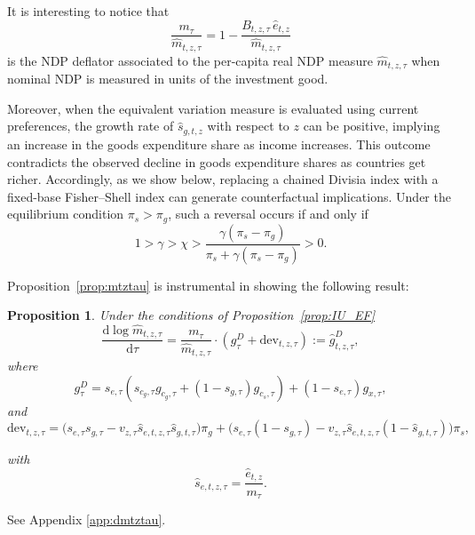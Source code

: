 \documentclass[12pt,a4paper]{article}
\newtheorem{proposition}{Proposition}
\begin{document}
\noindent It is interesting to notice that 
\[
\frac{m_\tau}{\widehat m_{t,z,\tau}} = 1 - \frac{B_{t,z,\tau}\, \widehat e_{t,z}}{\widehat m_{t,z,\tau}}
\]
is the NDP deflator associated to the per-capita real NDP measure $\widehat m_{t,z,\tau}$ when nominal NDP is measured in units of the investment good.

Moreover, when the equivalent variation measure is evaluated using current preferences, the growth rate of \( \widehat{s}_{g,t,z} \) with respect to \( z \) can be positive, implying an increase in the goods expenditure share as income increases. This outcome contradicts the observed decline in goods expenditure shares as countries get richer. Accordingly, as we show below, replacing a chained Divisia index with a fixed-base Fisher--Shell index can generate counterfactual implications. Under the equilibrium condition \( \pi_s > \pi_g \), such a reversal occurs if and only if
\[
1 > \gamma > \chi > \frac{\gamma (\pi_s - \pi_g)}
{\pi_s + \gamma (\pi_s - \pi_g)} > 0.
\]

\noindent Proposition~\ref{prop:mtztau} is instrumental in showing the following result:
\begin{proposition}\label{prop:dmtztau}
Under the conditions of Proposition~\ref{prop:IU_EF}
\[
\frac{\text{d} \log \widehat{m}_{t,z,\tau}}{\text{d}\tau} = 
\frac{m_\tau}{\widehat m_{t,z,\tau}} \cdot 
\left(g^{D}_\tau + \text{dev}_{t,z,\tau} \right) 
:= \widehat g^{D}_{t,z,\tau},
\]
where
\[
g^D_\tau = s_{e,\tau} \left( s_{c_g,\tau} g_{c_g,\tau} + (1 - s_{g,\tau}) g_{c_s,\tau} \right) + (1 - s_{e,\tau}) g_{x,\tau}  ,
\]
and
\[
\text{dev}_{t,z,\tau} = \Big(s_{e,\tau}s_{g,\tau} - v_{z,\tau}\widehat s_{e,t,z,\tau} \widehat s_{g,t,\tau} \Big) \pi_g
+ \Big(s_{e,\tau}(1-s_{g,\tau} )-  v_{z,\tau} \widehat s_{e,t,z,\tau}  (1-\widehat s_{g,t,\tau}) \Big) \pi_s ,
\]

with
\[
 \widehat s_{e,t,z,\tau} =  \frac{\widehat e_{t,z}}{m_{\tau}} .
 \]
 
\end{proposition}
 See Appendix \ref{app:dmtztau}.
\end{document}
